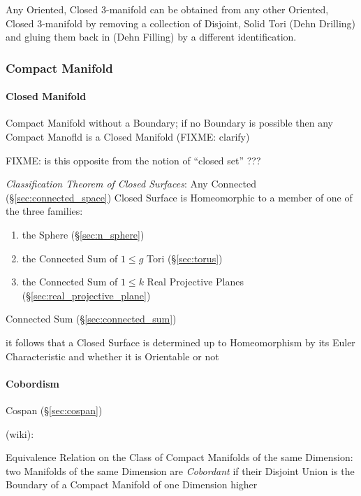 Any Oriented, Closed 3-manifold can be obtained from any other
Oriented, Closed 3-manifold by removing a collection of Disjoint,
Solid Tori (Dehn Drilling) and gluing them back in (Dehn Filling) by a
different identification.



\subsubsection{Compact Manifold}\label{sec:compact_manifold}

\paragraph{Closed Manifold}\label{sec:closed_manifold}\hfill

Compact Manifold without a Boundary; if no Boundary is possible then any
Compact Manofld is a Closed Manifold (FIXME: clarify)

FIXME: is this opposite from the notion of ``closed set'' ???

\emph{Classification Theorem of Closed Surfaces}: Any Connected
(\S\ref{sec:connected_space}) Closed Surface is Homeomorphic to a member of one
of the three families:
\begin{enumerate}
  \item the Sphere (\S\ref{sec:n_sphere})
  \item the Connected Sum of $1 \leq g$ Tori (\S\ref{sec:torus})
  \item the Connected Sum of $1 \leq k$ Real Projective Planes
    (\S\ref{sec:real_projective_plane})
\end{enumerate}
\fist Connected Sum (\S\ref{sec:connected_sum})

it follows that a Closed Surface is determined up to Homeomorphism by its Euler
Characteristic and whether it is Orientable or not



\paragraph{Cobordism}\label{sec:cobordism}\hfill

Cospan (\S\ref{sec:cospan})

(wiki):

Equivalence Relation on the Class of Compact Manifolds of the same Dimension:
two Manifolds of the same Dimension are \emph{Cobordant} if their Disjoint
Union is the Boundary of a Compact Manifold of one Dimension higher

